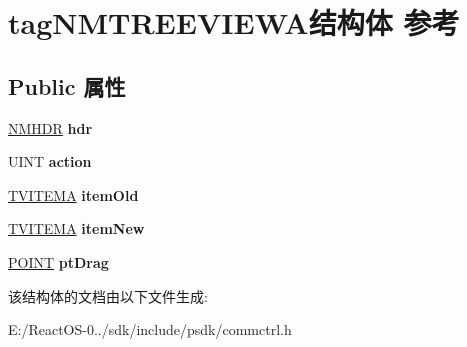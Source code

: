 \hypertarget{structtag_n_m_t_r_e_e_v_i_e_w_a}{}\section{tag\+N\+M\+T\+R\+E\+E\+V\+I\+E\+W\+A结构体 参考}
\label{structtag_n_m_t_r_e_e_v_i_e_w_a}
\subsection*{Public 属性}
\begin{DoxyCompactItemize}
\item 
\mbox{\label{structtag_n_m_t_r_e_e_v_i_e_w_a_a448f431bb85d6976256446046dbfc4c6}} 
\hyperlink{structtag_n_m_h_d_r}{N\+M\+H\+DR} {\bfseries hdr}
\item 
\mbox{\label{structtag_n_m_t_r_e_e_v_i_e_w_a_af5b4debdf73aaaf61c19905e384f9541}} 
U\+I\+NT {\bfseries action}
\item 
\mbox{\label{structtag_n_m_t_r_e_e_v_i_e_w_a_a30b8a3b9cde44ad58b3dad1364e2709a}} 
\hyperlink{structtag_t_v_i_t_e_m_a}{T\+V\+I\+T\+E\+MA} {\bfseries item\+Old}
\item 
\mbox{\label{structtag_n_m_t_r_e_e_v_i_e_w_a_a674f35f4d789edb81f24f6b1b3b90065}} 
\hyperlink{structtag_t_v_i_t_e_m_a}{T\+V\+I\+T\+E\+MA} {\bfseries item\+New}
\item 
\mbox{\label{structtag_n_m_t_r_e_e_v_i_e_w_a_afb3e3658ee8a8e678a7ceacfee37db04}} 
\hyperlink{structtag_p_o_i_n_t}{P\+O\+I\+NT} {\bfseries pt\+Drag}
\end{DoxyCompactItemize}


该结构体的文档由以下文件生成\+:\begin{DoxyCompactItemize}
\item 
E\+:/\+React\+O\+S-\/0../sdk/include/psdk/commctrl.\+h\end{DoxyCompactItemize}
